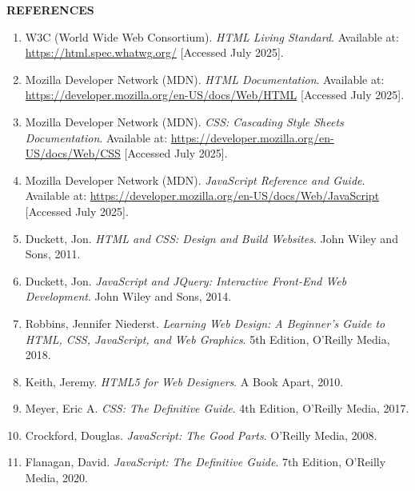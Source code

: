 \documentclass[a4paper,12pt,oneside]{report}
\numberwithin{equation}{chapter}
\numberwithin{figure}{chapter}
\numberwithin{table}{chapter}
\begin{document}
\newpage
\begin{center}
    \Large\textbf{REFERENCES}
\end{center}

\begin{enumerate}
    \item W3C (World Wide Web Consortium). \textit{HTML Living Standard}. Available at: \url{https://html.spec.whatwg.org/} [Accessed July 2025].

    \item Mozilla Developer Network (MDN). \textit{HTML Documentation}. Available at: \url{https://developer.mozilla.org/en-US/docs/Web/HTML} [Accessed July 2025].

    \item Mozilla Developer Network (MDN). \textit{CSS: Cascading Style Sheets Documentation}. Available at: \url{https://developer.mozilla.org/en-US/docs/Web/CSS} [Accessed July 2025].

    \item Mozilla Developer Network (MDN). \textit{JavaScript Reference and Guide}. Available at: \url{https://developer.mozilla.org/en-US/docs/Web/JavaScript} [Accessed July 2025].

    \item Duckett, Jon. \textit{HTML and CSS: Design and Build Websites}. John Wiley and Sons, 2011.

    \item Duckett, Jon. \textit{JavaScript and JQuery: Interactive Front-End Web Development}. John Wiley and Sons, 2014.

    \item Robbins, Jennifer Niederst. \textit{Learning Web Design: A Beginner’s Guide to HTML, CSS, JavaScript, and Web Graphics}. 5th Edition, O’Reilly Media, 2018.

    \item Keith, Jeremy. \textit{HTML5 for Web Designers}. A Book Apart, 2010.

    \item Meyer, Eric A. \textit{CSS: The Definitive Guide}. 4th Edition, O’Reilly Media, 2017.

    \item Crockford, Douglas. \textit{JavaScript: The Good Parts}. O’Reilly Media, 2008.

    \item Flanagan, David. \textit{JavaScript: The Definitive Guide}. 7th Edition, O’Reilly Media, 2020.


\end{enumerate}
\end{document}
